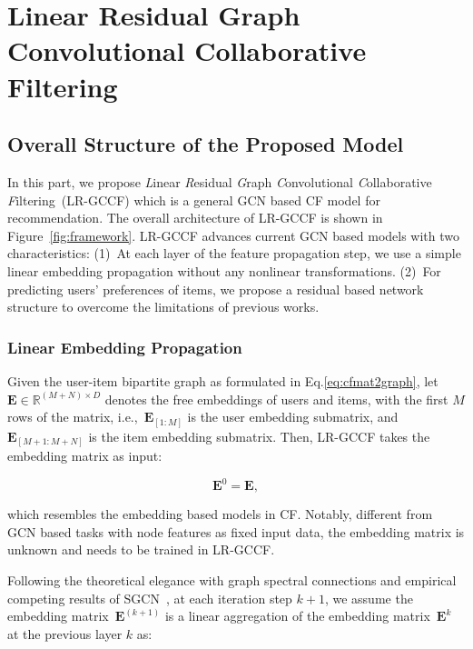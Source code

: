 \documentclass[letterpaper]{article} %
\newcommand{\Mat}[1]{\mathbf{#1}}
\begin{document}
\section{Linear Residual Graph Convolutional Collaborative Filtering}


\subsection{Overall Structure of the Proposed Model}
In this part, we propose  \emph{L}inear \emph{R}esidual \emph{G}raph \emph{C}onvolutional \emph{C}ollaborative \emph{F}iltering~(LR-GCCF) which is a general GCN based CF model for recommendation.
The overall architecture of LR-GCCF is shown in Figure~\ref{fig:framework}. LR-GCCF advances current GCN based models with two characteristics: (1)~At each layer of the feature propagation step, we use a simple linear embedding propagation without any nonlinear transformations. (2)~For predicting users' preferences of items, we propose a residual based network structure to overcome the limitations of previous works.

\subsubsection{Linear Embedding Propagation}
Given the user-item bipartite graph as formulated in Eq.\eqref{eq:cfmat2graph}, let {\footnotesize $\mathbf{E}\in\mathbb{R}^{(M+N)\times D}$} denotes the free embeddings of users and items, with the first $M$ rows of the matrix, i.e.,~{\footnotesize $\Mat{E}_{[1:M]}$} is the user embedding submatrix, and~{\footnotesize $\Mat{E}_{[M+1:M+N]}$} is the item embedding submatrix. Then, LR-GCCF takes the embedding matrix as input:

\begin{small}
\begin{equation}\label{eq:lrgcf_ini}
\Mat{E}^0= \Mat{E},
\end{equation}
\end{small}

\noindent which resembles the embedding based models in CF. Notably, different from GCN based tasks with node features as fixed input data, the embedding matrix is unknown and needs to be trained in LR-GCCF.

Following the theoretical elegance with graph spectral connections and empirical competing results of SGCN~\cite{ICML2019simplifying}, at each iteration step $k+1$, we assume the embedding matrix~{\footnotesize $\Mat{E}^{(k+1)}$}
is a linear aggregation of the embedding matrix~{\footnotesize $\Mat{E}^k$} at the previous layer $k$ as:
\end{document}
